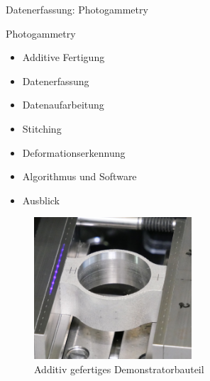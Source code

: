 \documentclass[../slides.tex]{subfiles}
\begin{document}
\begin{frame}{Datenerfassung: Photogammetry}
  
\begin{minipage}[t]{.5\textwidth}
    \begin{block}{Photogammetry}
        \begin{itemize}
            \item Additive Fertigung
            \item Datenerfassung
            \item Datenaufarbeitung
            \item Stitching 
            \item Deformationserkennung
            \item Algorithmus und Software
            \item Ausblick
        \end{itemize}
    \end{block}
    \end{minipage}
    \hfill
    \begin{minipage}[t]{.49\textwidth}
    \begin{figure}[]
        \includegraphics[height=150pt]{img_niklas/AM2_crop.JPG}
        \caption{Additiv gefertiges Demonstratorbauteil}
    \end{figure}
    \end{minipage}    
\end{frame}
\end{document}
